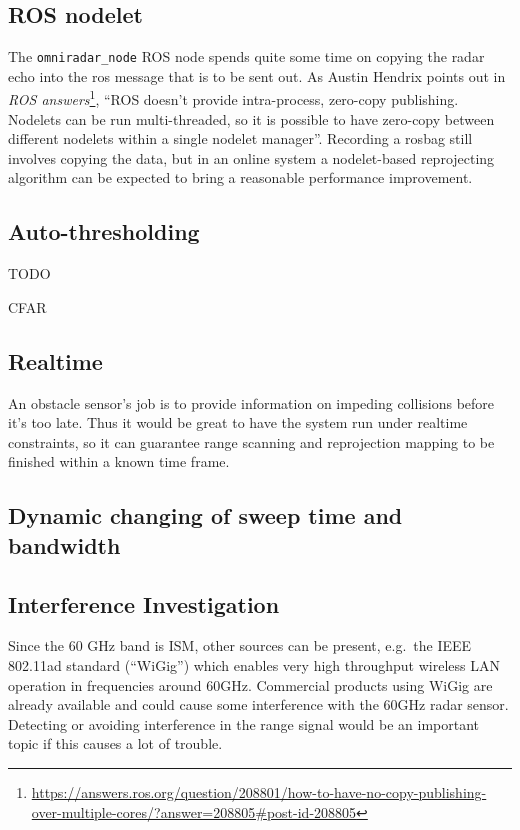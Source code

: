 \subsection{ROS nodelet}\label{ros-nodelet}

The \texttt{omniradar\_node} ROS node spends quite some time on copying
the radar echo into the ros message that is to be sent out. As Austin
Hendrix points out in \textit{ROS answers}\footnote{\url{https://answers.ros.org/question/208801/how-to-have-no-copy-publishing-over-multiple-cores/?answer=208805\#post-id-208805}}, ``ROS doesn't provide intra-process, zero-copy publishing.
Nodelets can be run multi-threaded, so it is possible to have zero-copy
between different nodelets within a single nodelet manager''. Recording
a rosbag still involves copying the data, but in an online system a
nodelet-based reprojecting algorithm can be expected to bring a
reasonable performance improvement.

\subsection{Auto-thresholding}\label{auto-thresholding}

TODO

CFAR

\subsection{Realtime}\label{realtime}

An obstacle sensor's job is to provide information on impeding
collisions before it's too late. Thus it would be great to have the
system run under realtime constraints, so it can guarantee range
scanning and reprojection mapping to be finished within a known time
frame.

\subsection{Dynamic changing of sweep time and bandwidth}\label{dynamic-changing-of-sweep-time-and-bandwidth}

\subsection{Interference Investigation}\label{interference-investigation}

Since the 60 GHz band is ISM, other sources can be present, e.g.~the
IEEE 802.11ad standard \cite{IEEE2014} (``WiGig'') which enables very
high throughput wireless LAN operation in frequencies around 60GHz.
Commercial products using WiGig are already available and could cause
some interference with the 60GHz radar sensor. Detecting or avoiding
interference in the range signal would be an important topic if this
causes a lot of trouble.

